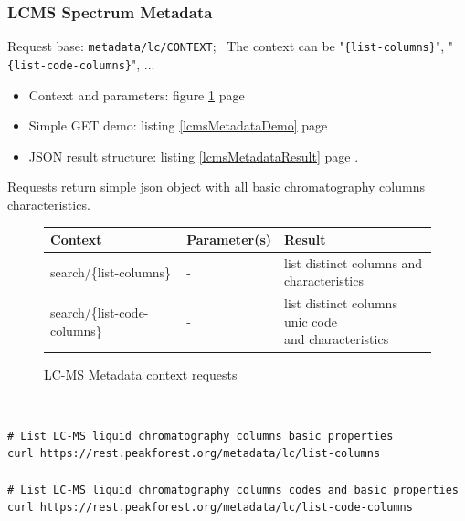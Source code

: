 \subsubsection{LCMS Spectrum Metadata}
\hspace*{\parindent}
Request base: \texttt{metadata/lc/CONTEXT};~
The context can be "\texttt{\{list-columns\}}", "\texttt{\{list-code-columns\}}", ... 
\begin{itemize}
	\item Context and parameters: \cf figure \ref{lcmsMetadataContexts} page \pageref{lcmsMetadataContexts}
	\item Simple GET demo: \cf listing \ref{lcmsMetadataDemo} page \pageref{lcmsMetadataDemo}
	\item JSON result structure: \cf listing \ref{lcmsMetadataResult} page \pageref{lcmsMetadataResult}. 
\end{itemize}
\hspace*{\parindent}
Requests return simple json object with all basic chromatography columns characteristics. 
\begin{figure}[htbp]
	\centering
	\footnotesize{
		\begin{minipage}{16.5 cm}
		\def\arraystretch{1}
		\begin{tabularx}{16cm}{|l|X|p{6cm}|}
			\hline	
			Context & Parameter(s) & Result \\ 
			\hline
			\hline
			search/\{list-columns\} & - & \specialcell{list distinct columns and \\ characteristics} \\ 
			\hline
			search/\{list-code-columns\} & - & \specialcell{list distinct columns unic code \\ and characteristics} \\ 
			\hline
		\end{tabularx} 
		\caption{LC-MS Metadata context requests}
		\label{lcmsMetadataContexts}
		\end{minipage}
	}%
\end{figure}
~\\
\begin{lstlisting}[language=custombash,caption={LC-MS Metadata spectra request Demo},label=lcmsMetadataDemo]
# List LC-MS liquid chromatography columns basic properties 
curl https://rest.peakforest.org/metadata/lc/list-columns

# List LC-MS liquid chromatography columns codes and basic properties 
curl https://rest.peakforest.org/metadata/lc/list-code-columns
\end{lstlisting}
